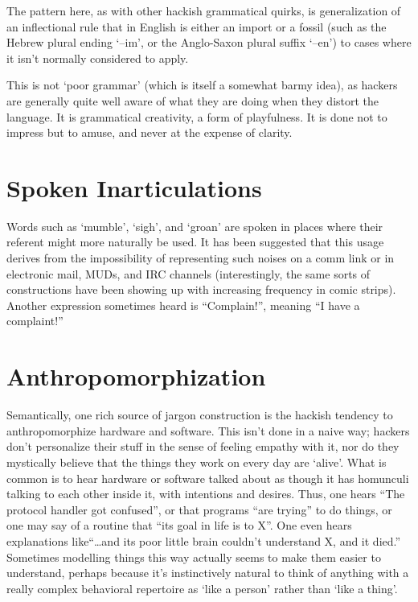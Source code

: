 	The pattern here, as with other hackish grammatical quirks, is
	generalization of an inflectional rule that in English is either an import
	or a fossil (such as the Hebrew plural ending `--im', or the Anglo-Saxon
	plural suffix `--en') to cases where it isn't normally considered to apply.

	This is not `poor grammar' (which is itself a somewhat barmy idea), as
	hackers are generally quite well aware of what they are doing when they
	distort the language. It is grammatical creativity, a form of playfulness.
	It is done not to impress but to amuse, and never at the expense of
	clarity.

\section*{Spoken Inarticulations}\label{Spoken-Inarticulations}

	Words such as `mumble', `sigh', and `groan' are spoken in places where
	their referent might more naturally be used. It has been suggested that
	this usage derives from the impossibility of representing such noises on a
	comm link or in electronic mail, MUDs, and IRC channels (interestingly, the
	same sorts of constructions have been showing up with increasing frequency
	in comic strips). Another expression sometimes heard is ``Complain!'',
	meaning ``I have a complaint!''

\section*{Anthropomorphization}\label{Anthropomorphization}

	Semantically, one rich source of jargon construction is the hackish
	tendency to anthropomorphize hardware and software. This isn't done in a
	naive way; hackers don't personalize their stuff in the sense of feeling
	empathy with it, nor do they mystically believe that the things they work
	on every day are `alive'. What is common is to hear hardware or software
	talked about as though it has homunculi talking to each other inside it,
	with intentions and desires. Thus, one hears ``The protocol handler got
	confused'', or that programs ``are trying'' to do things, or one may say of
	a routine that ``its goal in life is to X''. One even hears explanations
	like``\dots and its poor little brain couldn't understand X, and it died.''
	Sometimes modelling things this way actually seems to make them easier to
	understand, perhaps because it's instinctively natural to think of anything
	with a really complex behavioral repertoire as `like a person' rather than
	`like a thing'.

